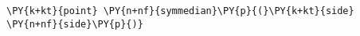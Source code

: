 \begin{Verbatim}[commandchars=\\\{\}]
    \PY{k+kt}{point} \PY{n+nf}{symmedian}\PY{p}{(}\PY{k+kt}{side} \PY{n+nf}{side}\PY{p}{)}
\end{Verbatim}
